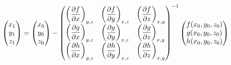 \documentclass{standalone}
\begin{document}
$\displaystyle
  \begin{pmatrix}
     x_1 \\ y_1 \\ z_1
  \end{pmatrix} = 
  \begin{pmatrix}
     x_0 \\ y_0 \\ z_0
  \end{pmatrix} - 
  \begin{pmatrix}
     \der{f}{x}{y,z} & \der{f}{y}{x,z} & \der{f}{z}{x,y} \\ 
     \der{g}{x}{y,z} & \der{g}{y}{x,z} & \der{g}{z}{x,y} \\
     \der{h}{x}{y,z} & \der{h}{y}{x,z} & \der{h}{z}{x,y} \\
  \end{pmatrix}^{-1}
  \begin{pmatrix}
     f(x_0,y_0,z_0) \\ g(x_0,y_0,z_0) \\ h(x_0,y_0,z_0)
  \end{pmatrix}
$
\end{document}
